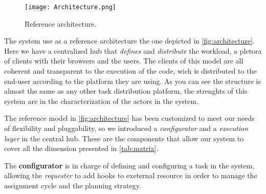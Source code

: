 




\begin{figure}[htb]
	\centering
	\texttt{[image: Architecture.png]}
	\caption{Reference architecture.}
	\label{fig:architecture}
\end{figure}
The system use as a reference architecture the one depicted in \autoref{fig:architecture}.
Here we have a centralized hub that \emph{defines} and \emph{distribute} the workload,
a pletora of clients with their browsers and the users. The clients of this model
are all coherent and transparent to the execution of the code, wich is distributed
to the end-user according to the platform they are using.
As you can see the structure is almost the same as any other task distribution
platform, the strenghts of this system are in the characterization of the actors
in the system.

The reference model in \autoref{fig:architecture} has been customized to meet our
needs of flexibility and pluggability, so we introduced a \emph{configurator} and
a \emph{execution layer} in the central hub. These are the components that allow
our system to cover all the dimension presented in \autoref{tab:matrix}.

The \textbf{configurator} is in charge of defining and configuring a task in the
system, allowing the \emph{requester} to add hooks to exeternal resource in order
to manage the assignment cycle and the planning strategy.

